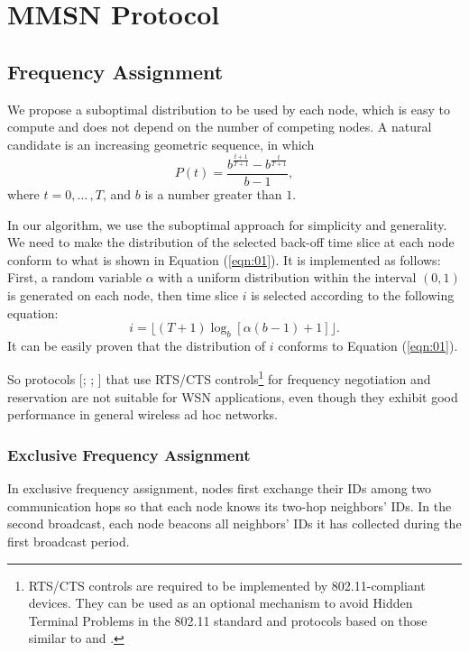 \documentclass[acmcmpt, twoside]{acmsmall}
\begin{document}
\section{MMSN Protocol}

\subsection{Frequency Assignment}

We propose a suboptimal distribution to be used by each node, which is
easy to compute and does not depend on the number of competing
nodes. A natural candidate is an increasing geometric sequence, in
which
\begin{equation}
\label{eqn:01}
P(t)=\frac{b^{\frac{t+1}{T+1}}-b^{\frac{t}{T+1}}}{b-1},
\end{equation}
where $t=0,{\ldots}\,,T$, and $b$ is a number greater than $1$.

In our algorithm, we use the suboptimal approach for simplicity and
generality. We need to make the distribution of the selected back-off
time slice at each node conform to what is shown in Equation
(\ref{eqn:01}). It is implemented as follows: First, a random
variable $\alpha$ with a uniform distribution within the interval
$(0, 1)$ is generated on each node, then time slice $i$ is selected
according to the following equation:
\[
i=\lfloor(T+1)\log_b[\alpha(b-1)+1]\rfloor.
\]
It can be easily proven that the distribution of $i$ conforms to Equation
(\ref{eqn:01}).

So protocols [;
; ] that use RTS/CTS
controls\footnote{RTS/CTS controls are required to be implemented by
802.11-compliant devices. They can be used as an optional mechanism
to avoid Hidden Terminal Problems in the 802.11 standard and
protocols based on those similar to  and
.} for frequency negotiation and reservation are not
suitable for WSN applications, even though they exhibit good
performance in general wireless ad hoc
networks.

\subsubsection{Exclusive Frequency Assignment}

In exclusive frequency assignment, nodes first exchange their IDs
among two communication hops so that each node knows its two-hop
neighbors' IDs. In the second broadcast, each node beacons all
neighbors' IDs it has collected during the first broadcast period.
\end{document}
